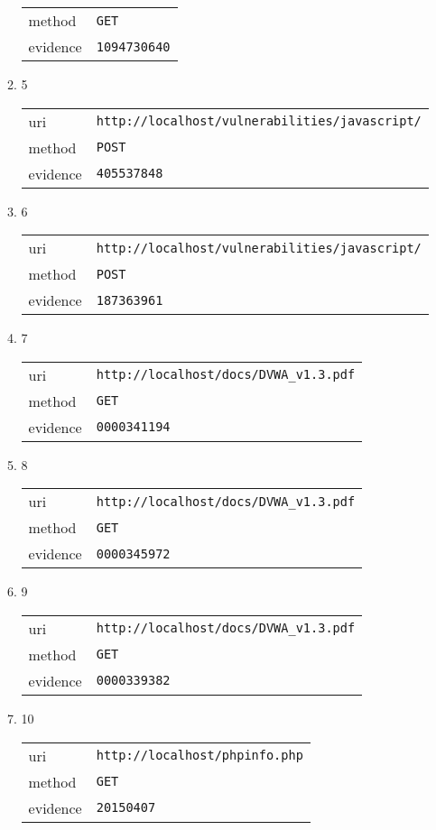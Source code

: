 \documentclass[10pt]{article}
\begin{document}
\begin{itemize}
\begin{enumerate}
\begin{tabular}{| l | p{12cm}}
method & \texttt{GET} \\
evidence & \texttt{1094730640} \\
\end{tabular}
\item[] 5
\begin{tabular}{| l | p{12cm}}
uri & \texttt{http://localhost/vulnerabilities/javascript/} \\
method & \texttt{POST} \\
evidence & \texttt{405537848} \\
\end{tabular}
\item[] 6
\begin{tabular}{| l | p{12cm}}
uri & \texttt{http://localhost/vulnerabilities/javascript/} \\
method & \texttt{POST} \\
evidence & \texttt{187363961} \\
\end{tabular}
\item[] 7
\begin{tabular}{| l | p{12cm}}
uri & \texttt{http://localhost/docs/DVWA\_v1.3.pdf} \\
method & \texttt{GET} \\
evidence & \texttt{0000341194} \\
\end{tabular}
\item[] 8
\begin{tabular}{| l | p{12cm}}
uri & \texttt{http://localhost/docs/DVWA\_v1.3.pdf} \\
method & \texttt{GET} \\
evidence & \texttt{0000345972} \\
\end{tabular}
\item[] 9
\begin{tabular}{| l | p{12cm}}
uri & \texttt{http://localhost/docs/DVWA\_v1.3.pdf} \\
method & \texttt{GET} \\
evidence & \texttt{0000339382} \\
\end{tabular}
\item[] 10
\begin{tabular}{| l | p{12cm}}
uri & \texttt{http://localhost/phpinfo.php} \\
method & \texttt{GET} \\
evidence & \texttt{20150407} \\

\end{tabular}
\end{enumerate}
\end{itemize}
\end{document}
